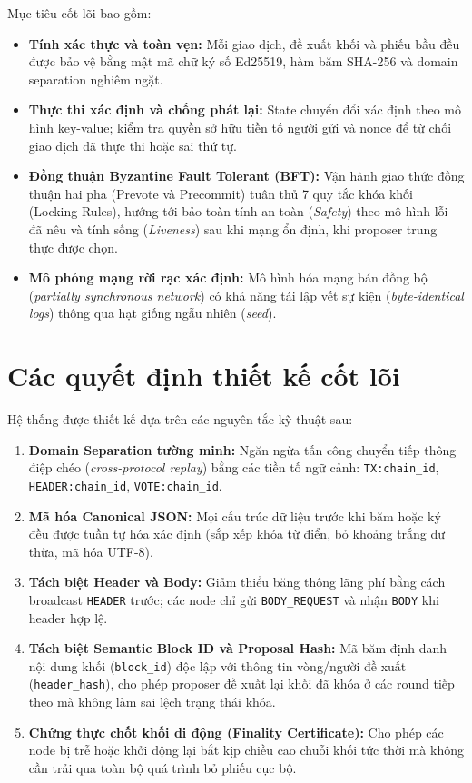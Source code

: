 \documentclass[10pt,a4paper]{report}
\begin{document}
Mục tiêu cốt lõi bao gồm:
\begin{itemize}
  \item \textbf{Tính xác thực và toàn vẹn:} Mỗi giao dịch, đề xuất khối và phiếu bầu đều được bảo vệ bằng mật mã chữ ký số Ed25519, hàm băm SHA-256 và domain separation nghiêm ngặt.
  \item \textbf{Thực thi xác định và chống phát lại:} State chuyển đổi xác định theo mô hình key-value; kiểm tra quyền sở hữu tiền tố người gửi và nonce để từ chối giao dịch đã thực thi hoặc sai thứ tự.
  \item \textbf{Đồng thuận Byzantine Fault Tolerant (BFT):} Vận hành giao thức đồng thuận hai pha (Prevote và Precommit) tuân thủ 7 quy tắc khóa khối (Locking Rules), hướng tới bảo toàn tính an toàn (\emph{Safety}) theo mô hình lỗi đã nêu và tính sống (\emph{Liveness}) sau khi mạng ổn định, khi proposer trung thực được chọn.
  \item \textbf{Mô phỏng mạng rời rạc xác định:} Mô hình hóa mạng bán đồng bộ (\emph{partially synchronous network}) có khả năng tái lập vết sự kiện (\emph{byte-identical logs}) thông qua hạt giống ngẫu nhiên (\emph{seed}).
\end{itemize}

\section{Các quyết định thiết kế cốt lõi}
Hệ thống được thiết kế dựa trên các nguyên tắc kỹ thuật sau:
\begin{enumerate}
  \item \textbf{Domain Separation tường minh:} Ngăn ngừa tấn công chuyển tiếp thông điệp chéo (\emph{cross-protocol replay}) bằng các tiền tố ngữ cảnh: \texttt{TX:chain\_id}, \texttt{HEADER:chain\_id}, \texttt{VOTE:chain\_id}.
  \item \textbf{Mã hóa Canonical JSON:} Mọi cấu trúc dữ liệu trước khi băm hoặc ký đều được tuần tự hóa xác định (sắp xếp khóa từ điển, bỏ khoảng trắng dư thừa, mã hóa UTF-8).
  \item \textbf{Tách biệt Header và Body:} Giảm thiểu băng thông lãng phí bằng cách broadcast \texttt{HEADER} trước; các node chỉ gửi \texttt{BODY\_REQUEST} và nhận \texttt{BODY} khi header hợp lệ.
  \item \textbf{Tách biệt Semantic Block ID và Proposal Hash:} Mã băm định danh nội dung khối (\texttt{block\_id}) độc lập với thông tin vòng/người đề xuất (\texttt{header\_hash}), cho phép proposer đề xuất lại khối đã khóa ở các round tiếp theo mà không làm sai lệch trạng thái khóa.
  \item \textbf{Chứng thực chốt khối di động (Finality Certificate):} Cho phép các node bị trễ hoặc khởi động lại bắt kịp chiều cao chuỗi khối tức thời mà không cần trải qua toàn bộ quá trình bỏ phiếu cục bộ.
\end{enumerate}
\end{document}
